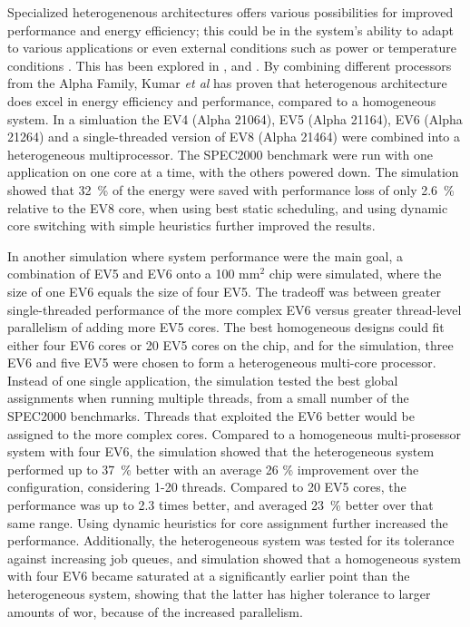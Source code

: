 Specialized heterogenenous architectures offers various possibilities for improved performance and energy efficiency;
this could be in the system's ability to adapt to various applications or even external conditions such as
power or temperature conditions \cite{heterogeneous-ee, heterogeneous-perf, heterogeneous-arch}.
This has been explored in \cite{heterogeneous-ee}, \cite{heterogeneous-perf} and \cite{heterogeneous-arch}.
By combining different processors from the Alpha Family, Kumar \textit{et al} has proven that heterogenous architecture does excel in energy efficiency and performance, compared to a homogeneous system.
In a simluation the EV4 (Alpha 21064), EV5 (Alpha 21164), EV6 (Alpha 21264) and a single-threaded version of EV8 (Alpha 21464) were combined into a heterogeneous multiprocessor.
The SPEC2000 benchmark were run with one application on one core at a time, with the others powered down.
The simulation showed that 32~\% of the energy were saved with performance loss of only 2.6~\% relative to the EV8 core, when using best static scheduling, and using dynamic core switching with simple heuristics further improved the results. \cite{heterogeneous-ee}

In another simulation where system performance were the main goal, a combination of EV5 and EV6 onto a 100 mm$^2$ chip were simulated, where the size of one EV6 equals the size of four EV5.
The tradeoff was between greater single-threaded performance of the more complex EV6 versus greater thread-level parallelism of adding more EV5 cores.
The best homogeneous designs could fit either four EV6 cores or 20 EV5 cores on the chip, and for the simulation, three EV6 and five EV5 were chosen to form a heterogeneous multi-core processor.
Instead of one single application, the simulation tested the best global assignments when running multiple threads, from a small number of the SPEC2000 benchmarks.
Threads that exploited the EV6 better would be assigned to the more complex cores.
Compared to a homogeneous multi-prosessor system with four EV6, the simulation showed that the heterogeneous system performed up to 37~\% better with an average 26 \% improvement over the configuration, considering 1-20 threads.
Compared to 20 EV5 cores, the performance was up to 2.3 times better, and averaged 23~\% better over that same range.
Using dynamic heuristics for core assignment further increased the performance.
Additionally, the heterogeneous system was tested for its tolerance against increasing job queues, and simulation showed that a homogeneous system with four EV6 became saturated at a significantly earlier point than the heterogeneous system, showing that the latter has higher tolerance to larger amounts of wor, because of the increased parallelism.
\cite{heterogeneous-perf}


